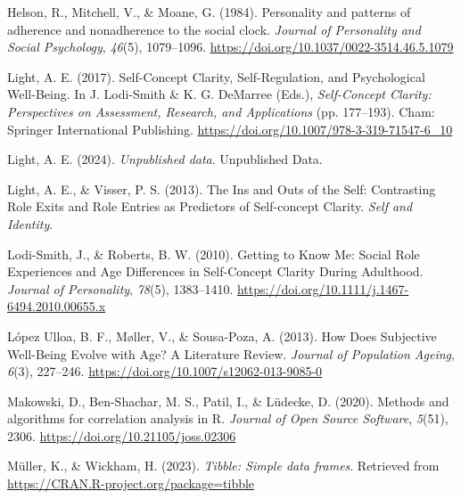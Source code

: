 \documentclass[
  man,floatsintext]{apa6}
\newlength{\cslhangindent}
\newlength{\cslentryspacingunit} %
\newenvironment{CSLReferences}[2] %
 {%
  \setlength{\parindent}{0pt}
  \ifodd #1
  \let\oldpar\par
  \def\par{\hangindent=\cslhangindent\oldpar}
  \fi
  \setlength{\parskip}{#2\cslentryspacingunit}
 }%
 {}
\begin{document}
\begin{CSLReferences}{1}{0}
\leavevmode{}%
Helson, R., Mitchell, V., \& Moane, G. (1984). Personality and patterns of adherence and nonadherence to the social clock. \emph{Journal of Personality and Social Psychology}, \emph{46}(5), 1079--1096. \url{https://doi.org/10.1037/0022-3514.46.5.1079}

\leavevmode{}%
Light, A. E. (2017). Self-{Concept Clarity}, {Self-Regulation}, and {Psychological Well-Being}. In J. Lodi-Smith \& K. G. DeMarree (Eds.), \emph{Self-{Concept Clarity}: {Perspectives} on {Assessment}, {Research}, and {Applications}} (pp. 177--193). {Cham}: {Springer International Publishing}. \url{https://doi.org/10.1007/978-3-319-71547-6_10}

\leavevmode{}%
Light, A. E. (2024). \emph{Unpublished data}. Unpublished Data.

\leavevmode{}%
Light, A. E., \& Visser, P. S. (2013). The {Ins} and {Outs} of the {Self}: {Contrasting Role Exits} and {Role Entries} as {Predictors} of {Self-concept Clarity}. \emph{Self and Identity}.

\leavevmode{}%
Lodi-Smith, J., \& Roberts, B. W. (2010). Getting to {Know Me}: {Social Role Experiences} and {Age Differences} in {Self-Concept Clarity During Adulthood}. \emph{Journal of Personality}, \emph{78}(5), 1383--1410. \url{https://doi.org/10.1111/j.1467-6494.2010.00655.x}

\leavevmode{}%
López Ulloa, B. F., Møller, V., \& Sousa-Poza, A. (2013). How {Does Subjective Well-Being Evolve} with {Age}? {A Literature Review}. \emph{Journal of Population Ageing}, \emph{6}(3), 227--246. \url{https://doi.org/10.1007/s12062-013-9085-0}

\leavevmode{}%
Makowski, D., Ben-Shachar, M. S., Patil, I., \& Lüdecke, D. (2020). Methods and algorithms for correlation analysis in {R}. \emph{Journal of Open Source Software}, \emph{5}(51), 2306. \url{https://doi.org/10.21105/joss.02306}

\leavevmode{}%
Müller, K., \& Wickham, H. (2023). \emph{Tibble: Simple data frames}. Retrieved from \url{https://CRAN.R-project.org/package=tibble}


\end{CSLReferences}
\end{document}
